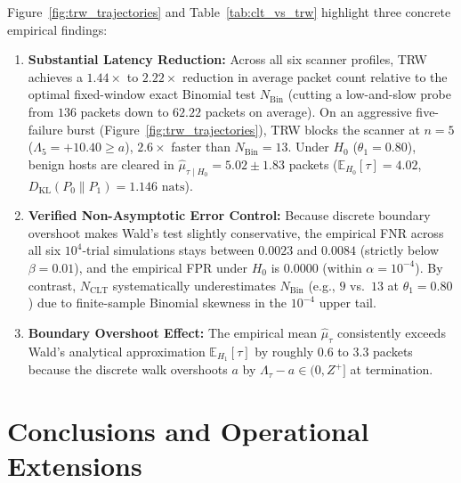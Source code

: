 \documentclass[oneside,noexaminfo,english]{sapthesis}
\numberwithin{equation}{section}
\numberwithin{figure}{section}
\numberwithin{table}{section}
\theoremstyle{compactplain}
\theoremstyle{compactdef}
\theoremstyle{compactrem}
\newcommand{\E}{\mathbb{E}}
\newcommand{\DKL}{D_{\mathrm{KL}}}
\begin{document}
Figure~\ref{fig:trw_trajectories} and Table~\ref{tab:clt_vs_trw} highlight three concrete empirical findings:
\begin{enumerate}
    \item \textbf{Substantial Latency Reduction:} Across all six scanner profiles, TRW achieves a $1.44\times$ to $2.22\times$ reduction in average packet count relative to the optimal fixed-window exact Binomial test $N_{\mathrm{Bin}}$ (cutting a low-and-slow probe from $136$ packets down to $62.22$ packets on average). On an aggressive five-failure burst (Figure~\ref{fig:trw_trajectories}), TRW blocks the scanner at $n = 5$ ($\Lambda_5 = +10.40 \ge a$), $2.6\times$ faster than $N_{\mathrm{Bin}} = 13$. Under $H_0$ ($\theta_1 = 0.80$), benign hosts are cleared in $\hat{\mu}_{\tau\mid H_0} = 5.02 \pm 1.83$ packets ($\E_{H_0}[\tau] = 4.02$, $\DKL(P_0 \parallel P_1) = 1.146\text{ nats}$).
    \item \textbf{Verified Non-Asymptotic Error Control:} Because discrete boundary overshoot makes Wald's test slightly conservative, the empirical FNR across all six $10^4$-trial simulations stays between $0.0023$ and $0.0084$ (strictly below $\beta = 0.01$), and the empirical FPR under $H_0$ is $0.0000$ (within $\alpha = 10^{-4}$). By contrast, $N_{\mathrm{CLT}}$ systematically underestimates $N_{\mathrm{Bin}}$ (e.g., $9$ vs.\ $13$ at $\theta_1 = 0.80$) due to finite-sample Binomial skewness in the $10^{-4}$ upper tail.
    \item \textbf{Boundary Overshoot Effect:} The empirical mean $\hat{\mu}_\tau$ consistently exceeds Wald's analytical approximation $\E_{H_1}[\tau]$ by roughly $0.6$ to $3.3$ packets because the discrete walk overshoots $a$ by $\Lambda_\tau - a \in (0, Z^+]$ at termination.
\end{enumerate}

\FloatBarrier

\section{Conclusions and Operational Extensions}
\label{sec:conclusions}
\end{document}
